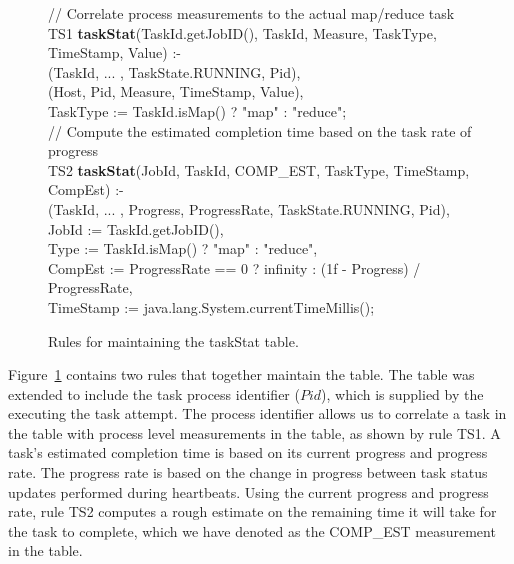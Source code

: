 \begin{figure}
\ssp
\centering
\begin{boxedminipage}{\linewidth}
// Correlate process measurements to the actual map/reduce task \\
TS1 {\bf taskStat}(TaskId.getJobID(), TaskId, Measure, TaskType, TimeStamp, Value) :- \\
(TaskId, ... , TaskState.RUNNING, Pid), \\
(Host, Pid, Measure, TimeStamp, Value), \\
\datalogspace TaskType := TaskId.isMap() ? "map" : "reduce"; \\
        
// Compute the estimated completion time based on the task rate of progress \\
TS2 {\bf taskStat}(JobId, TaskId, COMP\_EST, TaskType, TimeStamp, CompEst) :- \\
(TaskId, ... , Progress, ProgressRate, TaskState.RUNNING, Pid), \\
\datalogspace JobId := TaskId.getJobID(), \\
\datalogspace Type := TaskId.isMap() ? "map" : "reduce", \\
\datalogspace CompEst := ProgressRate == 0 ? infinity : (1f - Progress) / ProgressRate, \\
\datalogspace TimeStamp := java.lang.System.currentTimeMillis(); \\
\end{boxedminipage}
\caption{\label{ch:hop:fig:taskstat} Rules for maintaining the taskStat table.}
\end{figure}

Figure~\ref{ch:hop:fig:taskstat} contains two rules that together maintain the  table. 
The  table was extended to include the task process identifier ($Pid$), which is supplied
by the \TT executing the task attempt. The process identifier allows us to correlate a task in the  
table with process level measurements in the  table, as shown by rule TS1. 
A task's estimated completion time is based on its current progress and progress rate. The progress rate
is based on the change in progress between task status updates performed during \TT heartbeats. 
Using the current progress and progress rate, rule TS2 computes a rough estimate on the remaining time
it will take for the task to complete, which we have denoted as the COMP\_EST measurement in the 
 table. 


